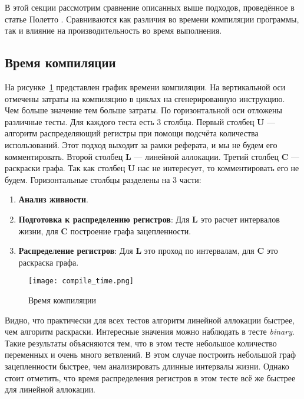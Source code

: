 В этой секции рассмотрим сравнение описанных выше подходов, проведённое в статье Полетто \cite{poletto1999}.
Сравниваются как различия во времени компиляции программы,
так и влияние на производительность во время выполнения.

\subsection{Время компиляции}

На рисунке~\ref{fig:compile_bench} представлен график времени компиляции.
На вертикальной оси отмечены затраты на компиляцию в циклах на сгенерированную инструкцию.
Чем больше значение тем больше затраты.
По горизонтальной оси отложены различные тесты.
Для каждого теста есть 3 столбца.
Первый столбец \textbf{U} --- алгоритм распределяющий регистры при помощи подсчёта количества использований.
Этот подход выходит за рамки реферата, и мы не будем его комментировать.
Второй столбец \textbf{L} --- линейной аллокации.
Третий столбец \textbf{C} --- раскраски графа.
Так как столбец \textbf{U} нас не интересует, то комментировать его не будем.
Горизонтальные столбцы разделены на 3 части:

\begin{enumerate}
	\item \textbf{Анализ живности}.

	\item \textbf{Подготовка к распределению регистров}: Для \textbf{L} это расчет интервалов жизни,
	для \textbf{C} построение графа зацепленности.
	
	\item \textbf{Распределение регистров}: Для \textbf{L} это проход по интервалам, для \textbf{C} это раскраска графа.
\end{enumerate}

\begin{figure}[h]
	\texttt{[image: compile\_time.png]}
	\caption{Время компиляции}
	\label{fig:compile_bench}
\end{figure}

Видно, что практически для всех тестов алгоритм линейной аллокации быстрее, чем алгоритм раскраски.
Интересные значения можно наблюдать в тесте \textit{binary}.
Такие результаты объясняются тем, что в этом тесте небольшое количество переменных и очень много ветвлений.
В этом случае построить небольшой граф зацепленности быстрее, чем анализировать длинные интервалы жизни.
Однако стоит отметить, что время распределения регистров в этом тесте всё же быстрее для линейной аллокации.

